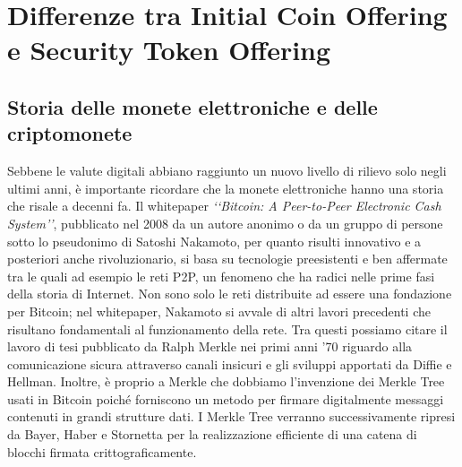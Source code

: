 \chapter{Differenze tra Initial Coin Offering e Security Token Offering}                %
\lhead[\fancyplain{}{\bfseries\thepage}]{\fancyplain{}{\bfseries\rightmark}}

\section{Storia delle monete elettroniche e delle criptomonete}

Sebbene le valute digitali abbiano raggiunto un nuovo livello di rilievo solo negli ultimi anni, è importante ricordare che la monete elettroniche hanno una storia che risale a decenni fa. Il whitepaper \textit{‘‘Bitcoin: A Peer-to-Peer Electronic Cash System’’}\cite{K1}, pubblicato nel 2008 da un autore anonimo o da un gruppo di persone sotto lo pseudonimo di Satoshi Nakamoto, per quanto risulti innovativo e a posteriori anche rivoluzionario, si basa su tecnologie preesistenti e ben affermate tra le quali ad esempio le reti P2P, un fenomeno che ha radici nelle prime fasi della storia di Internet. Non sono solo le reti distribuite ad essere una fondazione per Bitcoin; nel whitepaper, Nakamoto si avvale di altri lavori precedenti che risultano fondamentali al funzionamento della rete. Tra questi possiamo citare il lavoro di tesi pubblicato da Ralph Merkle nei primi anni ’70  riguardo alla comunicazione sicura attraverso canali insicuri e gli sviluppi apportati da Diffie e Hellman\cite{K2,K3}. Inoltre, è proprio a Merkle che dobbiamo l’invenzione dei Merkle Tree usati in Bitcoin poiché forniscono un metodo per firmare digitalmente messaggi contenuti in grandi strutture dati\cite{K4}. I Merkle Tree verranno successivamente ripresi da Bayer, Haber e Stornetta per la realizzazione efficiente di una catena di blocchi firmata crittograficamente\cite{K5}.

